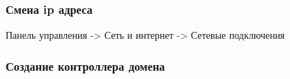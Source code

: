 \documentclass[a4paper, 12pt]{report}
\begin{document}
	\clearpage

	\subsubsection{Смена ip адреса}
	
	Панель управления -> Сеть и интернет -> Сетевые подключения
	
	\begin{figure}[h]
		\label{fig:image}
	\end{figure}

	\begin{figure}[h]
		\label{fig:image}
	\end{figure}

	\clearpage
	
	\subsubsection{Создание контроллера домена}
	
\end{document}

